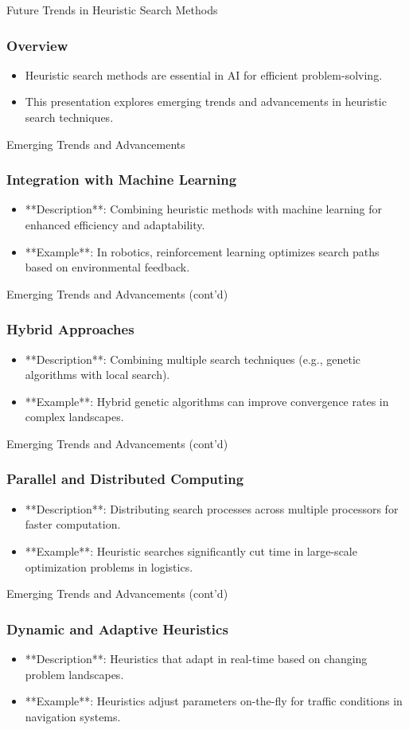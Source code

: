 \documentclass[aspectratio=169]{beamer}
\begin{document}
\begin{frame}{Future Trends in Heuristic Search Methods}
    \frametitle{Overview}
    \begin{itemize}
        \item Heuristic search methods are essential in AI for efficient problem-solving.
        \item This presentation explores emerging trends and advancements in heuristic search techniques.
    \end{itemize}
\end{frame}

\begin{frame}{Emerging Trends and Advancements}
    \frametitle{Integration with Machine Learning}
    \begin{itemize}
        \item **Description**: Combining heuristic methods with machine learning for enhanced efficiency and adaptability.
        \item **Example**: In robotics, reinforcement learning optimizes search paths based on environmental feedback.
    \end{itemize}
\end{frame}

\begin{frame}{Emerging Trends and Advancements (cont'd)}
    \frametitle{Hybrid Approaches}
    \begin{itemize}
        \item **Description**: Combining multiple search techniques (e.g., genetic algorithms with local search).
        \item **Example**: Hybrid genetic algorithms can improve convergence rates in complex landscapes.
    \end{itemize}
\end{frame}

\begin{frame}{Emerging Trends and Advancements (cont'd)}
    \frametitle{Parallel and Distributed Computing}
    \begin{itemize}
        \item **Description**: Distributing search processes across multiple processors for faster computation.
        \item **Example**: Heuristic searches significantly cut time in large-scale optimization problems in logistics.
    \end{itemize}
\end{frame}

\begin{frame}{Emerging Trends and Advancements (cont'd)}
    \frametitle{Dynamic and Adaptive Heuristics}
    \begin{itemize}
        \item **Description**: Heuristics that adapt in real-time based on changing problem landscapes.
        \item **Example**: Heuristics adjust parameters on-the-fly for traffic conditions in navigation systems.
    \end{itemize}
\end{frame}
\end{document}

